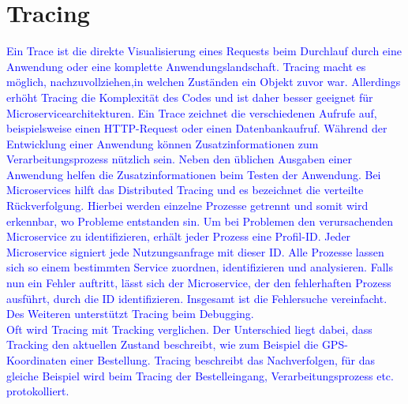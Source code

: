 \section{Tracing}\label{sec:tracing}
\textcolor{blue}{
    Ein Trace ist die direkte Visualisierung eines Requests beim Durchlauf durch eine Anwendung oder eine komplette Anwendungslandschaft.
    Tracing macht es möglich, nachzuvollziehen,in welchen Zuständen ein Objekt zuvor war.
    Allerdings erhöht Tracing die Komplexität des Codes und ist daher besser geeignet für Microservicearchitekturen.
    Ein Trace zeichnet die verschiedenen Aufrufe auf, beispielsweise einen HTTP-Request oder einen Datenbankaufruf.
    Während der Entwicklung einer Anwendung können Zusatzinformationen zum Verarbeitungsprozess nützlich sein.
    Neben den üblichen Ausgaben einer Anwendung helfen die Zusatzinformationen beim Testen der Anwendung.
    Bei Microservices hilft das Distributed Tracing und es bezeichnet die verteilte Rückverfolgung.
    Hierbei werden einzelne Prozesse getrennt und somit wird erkennbar, wo Probleme entstanden sin.
    Um bei Problemen den verursachenden Microservice zu identifizieren, erhält jeder Prozess eine Profil-ID.
    Jeder Microservice signiert jede Nutzungsanfrage mit dieser ID.
    Alle Prozesse lassen sich so einem bestimmten Service zuordnen, identifizieren und analysieren.
    Falls nun ein Fehler auftritt, lässt sich der Microservice, der den fehlerhaften Prozess ausführt, durch die ID identifizieren.
    Insgesamt ist die Fehlersuche vereinfacht.
    Des Weiteren unterstützt Tracing beim Debugging.
    \\
    Oft wird Tracing mit Tracking verglichen.
    Der Unterschied liegt dabei, dass Tracking den aktuellen Zustand beschreibt, wie zum Beispiel die GPS-Koordinaten einer Bestellung.
    Tracing beschreibt das Nachverfolgen, für das gleiche Beispiel wird beim Tracing der Bestelleingang, Verarbeitungsprozess etc. protokolliert.
}\autocite{adesso, monstarlab}


